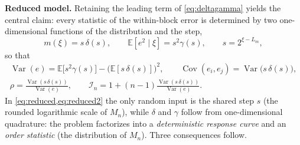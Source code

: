 \documentclass[review,hidelinks,oneeqnum,onetabnum,onefignum,onethmnum]{siamart251216}
\begin{document}
\noindent\textbf{Reduced model.} Retaining the leading term of
\cref{eq:deltagamma} yields the central claim: every statistic of the
within-block error is determined by two one-dimensional functions of the
distribution and the step,
\begin{equation}
m(\xi)=s\,\delta(s),\qquad
\mathbb{E}[e^2\mid\xi]=s^2\gamma(s),
\qquad s=2^{\xi-L_m},
\label{eq:reduced}
\end{equation}
so that
\begin{equation}
\begin{gathered}
\operatorname{Var}(e)=\mathbb{E}\bigl[s^2\gamma(s)\bigr]-\bigl(\mathbb{E}[s\,\delta(s)]\bigr)^2,
\qquad
\operatorname{Cov}(e_i,e_j)=\operatorname{Var}\bigl(s\,\delta(s)\bigr),\\[2pt]
\rho=\frac{\operatorname{Var}(s\,\delta(s))}{\operatorname{Var}(e)},
\qquad
\mathcal I_n=1+(n-1)\frac{\operatorname{Var}(s\,\delta(s))}{\operatorname{Var}(e)} .
\end{gathered}
\label{eq:reduced2}
\end{equation}
In \cref{eq:reduced,eq:reduced2} the only random input is the shared step $s$
(the rounded logarithmic scale of $M_n$), while $\delta$ and $\gamma$ follow
from one-dimensional quadrature: the problem factorizes into a
\emph{deterministic response curve} and an \emph{order statistic} (the
distribution of $M_n$). Three consequences follow.
\end{document}
